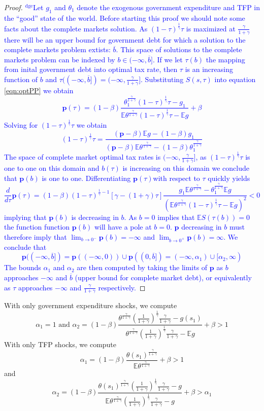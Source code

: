 \documentclass[12pt]{article}
\newcommand{\dge}[1]{\textcolor{blue}{$^{\textrm{dge}}${#1}}}
\newcommand{\EE}{\mathbb E}
\begin{document}
\begin{proof}  \dge{Let $g_1$ and $\theta_1$ denote the exogenous government expenditure and TFP in the ``good'' state of the world.  Before starting this proof we should note some facts about the complete markets solution.  As $(1-\tau)^\frac1\gamma\tau$ is maximized at $\frac\gamma{1+\gamma}$ there will be an upper bound for government debt for which a solution to the complete markets problem extists: $\overline b$.  This space of solutions to the complete markets problem can be indexed by $b\in(-\infty,\overline b]$.  If we let $\tau(b)$ the mapping from inital government debt into optimal tax rate, then $\tau$ is an increasing function of $b$ and $\tau((-\infty,\overline b]) = (-\infty,\frac{\gamma}{1+\gamma}]$.    Substituting $S(s,\tau)$ into equation \eqref{eqn:optPP} we obtain
\[
	\bm p(\tau) = (1-\beta)\frac{\theta_1^\frac\gamma{1+\gamma}(1-\tau)^\frac1\gamma\tau-g_1}{\EE\theta^\frac\gamma{1+\gamma}(1-\tau)^\frac1\gamma\tau - \EE g} + \beta
\]  Solving for $(1-\tau)^\frac1\gamma\tau$ we obtain
\[
	(1-\tau)^\frac{1}{\gamma}\tau = \frac{(\bm p-\beta)\EE g-(1-\beta)g_1}{(\bm p - \beta)\EE\theta^\frac{\gamma}{1+\gamma}-(1-\beta)\theta_1^\frac{\gamma}{1+\gamma}}
\]  The space of complete market optimal tax rates is $(-\infty,\frac\gamma{1+\gamma}]$, as $(1-\tau)^\frac1\gamma\tau$ is one to one on this domain and $b(\tau)$ is increasing on this domain we conclude that $\bm p(b)$ is one to one. Differentiating $\bm p(\tau)$with respect to $\tau$ quickly yields
\[ 
	\frac{d}{d\tau} \bm p(\tau) = (1-\beta)(1-\tau)^{\frac1\gamma-1}\left[\gamma-(1+\gamma)\tau\right]\frac{g_1\EE\theta^\frac{\gamma}{1+\gamma}-\theta_1^\frac\gamma{1+\gamma}\EE g }{(\EE\theta^\frac\gamma{1+\gamma}(1-\tau)^\frac1\gamma\tau-\EE g)^2} <0
\] implying that $\bm p(b)$ is decreasing in $b$.  As $b =0$ implies that $\EE S(\tau(b)) =0$ the function function $\bm p(b)$ will have a pole at $b = 0$.  $\bm p$ decreasing in $b$ must therefore imply that $\lim_{b\rightarrow0^{-} } \bm p(b) = -\infty$ and $\lim_{b\rightarrow 0^+} \bm p(b) = \infty$.  We conclude that 
\[
	\bm p((-\infty,\overline b]) = \bm p((-\infty,0))\cup \bm p((0,\overline b]) = (-\infty,\alpha_1)\cup[\alpha_2,\infty)
\]The bounds $\alpha_1$ and $\alpha_2$ are then computed by taking the limits of $\bm p$ as $b$ approaches $-\infty$ and $\overline b$ (upper bound for complete market debt), or equivalently as $\tau$ approaches $-\infty$ and $\frac\gamma{1+\gamma}$ respectively.}
\end{proof}
 With only government expenditure shocks, we compute
		\[
			\alpha_1 = 1 \text{  and }  \alpha_2 = (1-\beta)\frac{\theta^\frac{\gamma}{1+\gamma}\left(\frac{1}{1+\gamma}\right)^\frac1\gamma\frac{\gamma}{1+\gamma}-g(s_1)}{\theta^\frac{\gamma}{1+\gamma}\left(\frac{1}{1+\gamma}\right)^\frac1\gamma\frac{\gamma}{1+\gamma}-\EE g} +\beta>1
		\]
		With only TFP shocks, we compute
		\[
			\alpha_1 = (1-\beta)\frac{\theta(s_1)^\frac{\gamma}{1+\gamma}}{\EE\theta^\frac{\gamma}{1+\gamma}}+\beta > 1
		\]and
		\[
		\alpha_2 = (1-\beta)\frac{\theta(s_1)^\frac{\gamma}{1+\gamma}\left(\frac{1}{1+\gamma}\right)^\frac1\gamma\frac{\gamma}{1+\gamma}-g}{\EE\theta^\frac{\gamma}{1+\gamma}\left(\frac{1}{1+\gamma}\right)^\frac1\gamma\frac{\gamma}{1+\gamma}-g}+\beta>\alpha_1
		\]
\end{document}

